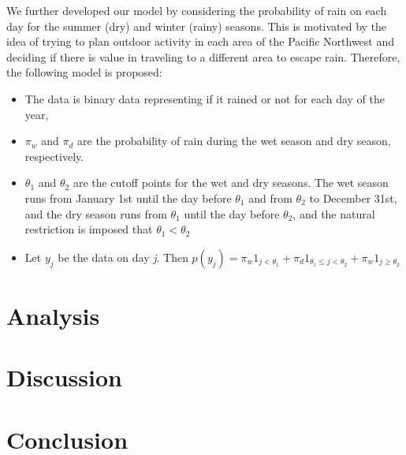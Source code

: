 \documentclass{article}
\begin{document}

We further developed our model by considering the probability of rain on each day for the summer (dry) and winter (rainy) seasons. This is motivated by the idea of trying to plan outdoor activity in each area of the Pacific Northwest and deciding if there is value in traveling to a different area to escape rain.
Therefore, the following model is proposed:
\begin{itemize}
\item The data is binary data representing if it rained or not for each day of the year,
\item $\pi_w$ and $\pi_d$ are the probability of rain during the wet season and dry season, respectively.
\item $\theta_1$ and $\theta_2$ are the cutoff points for the wet and dry seasons. The wet season runs from January 1st until the day before $\theta_1$ and from $\theta_2$ to December 31st, and the dry season runs from $\theta_1$ until the day before $\theta_2$, and the natural restriction is imposed that $\theta_1 < \theta_2$
\item Let $y_j$ be the data on day \textit{j}. Then $p(y_j) = \pi_w  1_{j < \theta_1} + \pi_d  1_{\theta_1\leq j < \theta_2} +\pi_w  1_{j \geq \theta_2} $
\end{itemize}

\section{Analysis}

\section{Discussion}

\section{Conclusion}
\end{document}
